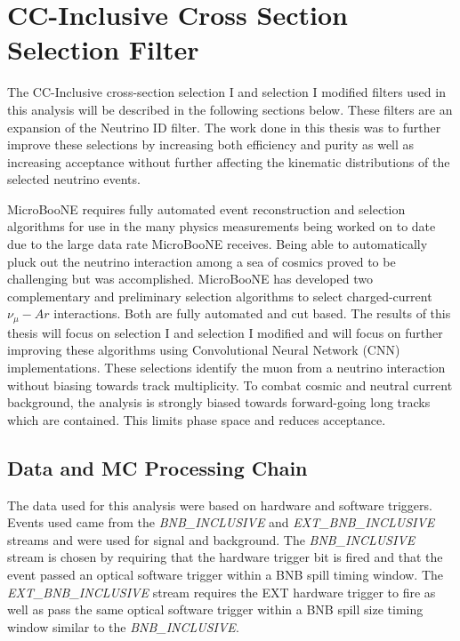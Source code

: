 \chapter{CC-Inclusive Cross Section Selection Filter} \label{ch:meas}
The CC-Inclusive cross-section selection I and selection I modified filters used in this analysis will be described in the following sections below. These filters are an expansion of the Neutrino ID filter. The work done in this thesis was to further improve these selections by increasing both efficiency and purity as well as increasing acceptance without further affecting the kinematic distributions of the selected neutrino events.
 
MicroBooNE requires fully automated event reconstruction and selection algorithms for use in the many physics measurements being worked on to date due to the large data rate MicroBooNE receives. Being able to automatically pluck out the neutrino interaction among a sea of cosmics proved to be challenging but was accomplished. MicroBooNE has developed two complementary and preliminary selection algorithms to select charged-current $\nu_{\mu}-Ar$ interactions. Both are fully automated and cut based. The results of this thesis will focus on selection I and selection I modified and will focus on further improving these algorithms using Convolutional Neural Network (CNN) implementations. These selections identify the muon from a neutrino interaction without biasing towards track multiplicity. To combat cosmic and neutral current background, the analysis is strongly biased towards forward-going long tracks which are contained. This limits phase space and reduces acceptance. 

\section{Data and MC Processing Chain}
The data used for this analysis were based on hardware and software triggers. Events used came from the \textit{BNB\_INCLUSIVE} and \textit{EXT\_BNB\_INCLUSIVE} streams and were used for signal and background. The \textit{BNB\_INCLUSIVE} stream is chosen by requiring that the hardware trigger bit is fired and that the event passed an optical software trigger within a BNB spill timing window. The \textit{EXT\_BNB\_INCLUSIVE} stream requires the EXT hardware trigger to fire as well as pass the same optical software trigger within a BNB spill size timing window similar to the \textit{BNB\_INCLUSIVE}. 

